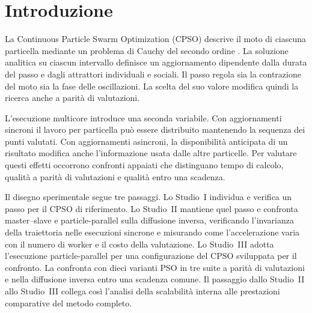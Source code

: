 \section{Introduzione}
\label{sec:introduction}

La Continuous Particle Swarm Optimization (CPSO) descrive il moto di ciascuna particella mediante un problema di Cauchy del secondo ordine \citep{orlando2020analytic}. La soluzione analitica su ciascun intervallo definisce un aggiornamento dipendente dalla durata del passo e dagli attrattori individuali e sociali. Il passo regola sia la contrazione del moto sia la fase delle oscillazioni. La scelta del suo valore modifica quindi la ricerca anche a parità di valutazioni.

L'esecuzione multicore introduce una seconda variabile. Con aggiornamenti sincroni il lavoro per particella può essere distribuito mantenendo la sequenza dei punti valutati. Con aggiornamenti asincroni, la disponibilità anticipata di un risultato modifica anche l'informazione usata dalle altre particelle. Per valutare questi effetti occorrono confronti appaiati che distinguano tempo di calcolo, qualità a parità di valutazioni e qualità entro una scadenza.

Il disegno sperimentale segue tre passaggi. Lo Studio~I individua e verifica un passo per il CPSO di riferimento. Lo Studio~II mantiene quel passo e confronta master--slave e particle-parallel sulla diffusione inversa, verificando l'invarianza della traiettoria nelle esecuzioni sincrone e misurando come l'accelerazione varia con il numero di worker e il costo della valutazione. Lo Studio~III adotta l'esecuzione particle-parallel per una configurazione del CPSO sviluppata per il confronto. La confronta con dieci varianti PSO in tre suite a parità di valutazioni e nella diffusione inversa entro una scadenza comune. Il passaggio dallo Studio~II allo Studio~III collega così l'analisi della scalabilità interna alle prestazioni comparative del metodo completo.
